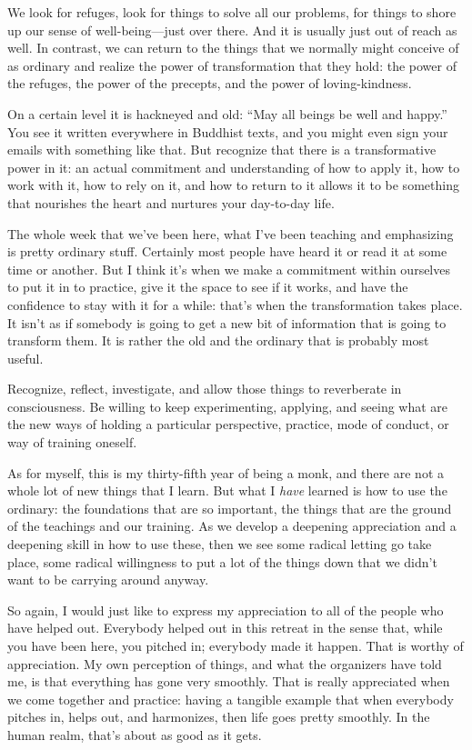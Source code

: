 We look for refuges, look for things to solve all our problems, for
things to shore up our sense of well-being—just over there. And it is
usually just out of reach as well. In contrast, we can return to the
things that we normally might conceive of as ordinary and realize the
power of transformation that they hold: the power of the refuges, the
power of the precepts, and the power of loving-kindness.

On a certain level it is hackneyed and old: “May all beings be well and
happy.” You see it written everywhere in Buddhist texts, and you might
even sign your emails with something like that. But recognize that there
is a transformative power in it: an actual commitment and understanding
of how to apply it, how to work with it, how to rely on it, and how to
return to it allows it to be something that nourishes the heart and
nurtures your day-to-day life.

The whole week that we’ve been here, what I’ve been teaching and
emphasizing is pretty ordinary stuff. Certainly most people have heard
it or read it at some time or another. But I think it’s when we make a
commitment within ourselves to put it in to practice, give it the space
to see if it works, and have the confidence to stay with it for a while:
that’s when the transformation takes place. It isn’t as if somebody is
going to get a new bit of information that is going to transform them.
It is rather the old and the ordinary that is probably most useful.

Recognize, reflect, investigate, and allow those things to reverberate
in consciousness. Be willing to keep experimenting, applying, and seeing
what are the new ways of holding a particular perspective, practice,
mode of conduct, or way of training oneself.

As for myself, this is my thirty-fifth year of being a monk, and there
are not a whole lot of new things that I learn. But what I \emph{have}
learned is how to use the ordinary: the foundations that are so
important, the things that are the ground of the teachings and our
training. As we develop a deepening appreciation and a deepening skill
in how to use these, then we see some radical letting go take place,
some radical willingness to put a lot of the things down that we didn’t
want to be carrying around anyway.

So again, I would just like to express my appreciation to all of the
people who have helped out. Everybody helped out in this retreat in the
sense that, while you have been here, you pitched in; everybody made it
happen. That is worthy of appreciation. My own perception of things, and
what the organizers have told me, is that everything has gone very
smoothly. That is really appreciated when we come together and practice:
having a tangible example that when everybody pitches in, helps out, and
harmonizes, then life goes pretty smoothly. In the human realm, that’s
about as good as it gets.

